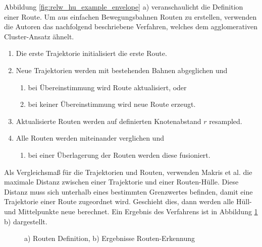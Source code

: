 Abbildung \ref{fig:relw_hu_example_envelope} a) veranschaulicht die Definition einer Route.
Um aus einfachen Bewegungsbahnen Routen zu erstellen, verwenden die Autoren das nachfolgend beschriebene Verfahren,
welches dem agglomerativen Cluster-Ansatz ähnelt.

\begin{enumerate}
    \item Die erste Trajektorie initialisiert die erste Route.
    \item Neue Trajektorien werden mit bestehenden Bahnen abgeglichen und
    \begin{enumerate}
        \item bei Übereinstimmung wird Route aktualisiert, oder
        \item bei keiner Übereinstimmung wird neue Route erzeugt.
    \end{enumerate}
    \item Aktualisierte Routen werden auf definierten Knotenabstand $r$ resampled.
    \item Alle Routen werden miteinander verglichen und
    \begin{enumerate}
        \item bei einer Überlagerung der Routen werden diese fusioniert.
    \end{enumerate}
\end{enumerate}

Als Vergleichsmaß für die Trajektorien und Routen, verwenden Makris et al. die maximale Distanz zwischen einer Trajektorie und
einer Routen-Hülle. Diese Distanz muss sich unterhalb eines bestimmten Grenzwertes befinden, damit eine Trajektorie
einer Route zugeordnet wird. Geschieht dies, dann werden alle Hüll- und Mittelpunkte neue berechnet.
Ein Ergebnis des Verfahrens ist in Abbildung \ref{fig:relw_results_makris} b) dargestellt.

\begin{figure}[H]
    \centering
    \qquad
    \caption[Routen-Definition und Ergebnisse Routen-Erkennung (Makris et al.)]{a) Routen Definition, b) Ergebnisse Routen-Erkennung \cite[]{Makris2005}}
    \label{fig:relw_results_makris}
\end{figure}


